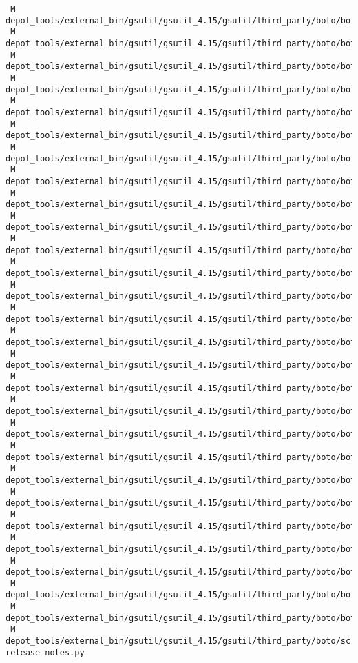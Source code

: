 \documentclass{article}
\begin{document}
\begin{verbatim}
 M depot_tools/external_bin/gsutil/gsutil_4.15/gsutil/third_party/boto/boto/roboto/awsqueryservice.py
 M depot_tools/external_bin/gsutil/gsutil_4.15/gsutil/third_party/boto/boto/roboto/param.py
 M depot_tools/external_bin/gsutil/gsutil_4.15/gsutil/third_party/boto/boto/s3/__init__.py
 M depot_tools/external_bin/gsutil/gsutil_4.15/gsutil/third_party/boto/boto/s3/bucket.py
 M depot_tools/external_bin/gsutil/gsutil_4.15/gsutil/third_party/boto/boto/s3/bucketlogging.py
 M depot_tools/external_bin/gsutil/gsutil_4.15/gsutil/third_party/boto/boto/s3/connection.py
 M depot_tools/external_bin/gsutil/gsutil_4.15/gsutil/third_party/boto/boto/s3/key.py
 M depot_tools/external_bin/gsutil/gsutil_4.15/gsutil/third_party/boto/boto/s3/keyfile.py
 M depot_tools/external_bin/gsutil/gsutil_4.15/gsutil/third_party/boto/boto/s3/resumable_download_handler.py
 M depot_tools/external_bin/gsutil/gsutil_4.15/gsutil/third_party/boto/boto/sdb/connection.py
 M depot_tools/external_bin/gsutil/gsutil_4.15/gsutil/third_party/boto/boto/sdb/db/blob.py
 M depot_tools/external_bin/gsutil/gsutil_4.15/gsutil/third_party/boto/boto/sdb/db/manager/sdbmanager.py
 M depot_tools/external_bin/gsutil/gsutil_4.15/gsutil/third_party/boto/boto/sdb/db/manager/xmlmanager.py
 M depot_tools/external_bin/gsutil/gsutil_4.15/gsutil/third_party/boto/boto/sdb/db/model.py
 M depot_tools/external_bin/gsutil/gsutil_4.15/gsutil/third_party/boto/boto/sdb/db/query.py
 M depot_tools/external_bin/gsutil/gsutil_4.15/gsutil/third_party/boto/boto/sdb/db/sequence.py
 M depot_tools/external_bin/gsutil/gsutil_4.15/gsutil/third_party/boto/boto/sdb/domain.py
 M depot_tools/external_bin/gsutil/gsutil_4.15/gsutil/third_party/boto/boto/sdb/queryresultset.py
 M depot_tools/external_bin/gsutil/gsutil_4.15/gsutil/third_party/boto/boto/services/bs.py
 M depot_tools/external_bin/gsutil/gsutil_4.15/gsutil/third_party/boto/boto/services/result.py
 M depot_tools/external_bin/gsutil/gsutil_4.15/gsutil/third_party/boto/boto/services/submit.py
 M depot_tools/external_bin/gsutil/gsutil_4.15/gsutil/third_party/boto/boto/ses/connection.py
 M depot_tools/external_bin/gsutil/gsutil_4.15/gsutil/third_party/boto/boto/sns/connection.py
 M depot_tools/external_bin/gsutil/gsutil_4.15/gsutil/third_party/boto/boto/sqs/message.py
 M depot_tools/external_bin/gsutil/gsutil_4.15/gsutil/third_party/boto/boto/sqs/queue.py
 M depot_tools/external_bin/gsutil/gsutil_4.15/gsutil/third_party/boto/boto/utils.py
 M depot_tools/external_bin/gsutil/gsutil_4.15/gsutil/third_party/boto/boto/vendored/six.py
 M depot_tools/external_bin/gsutil/gsutil_4.15/gsutil/third_party/boto/scripts/git-release-notes.py

\end{verbatim}
\end{document}
